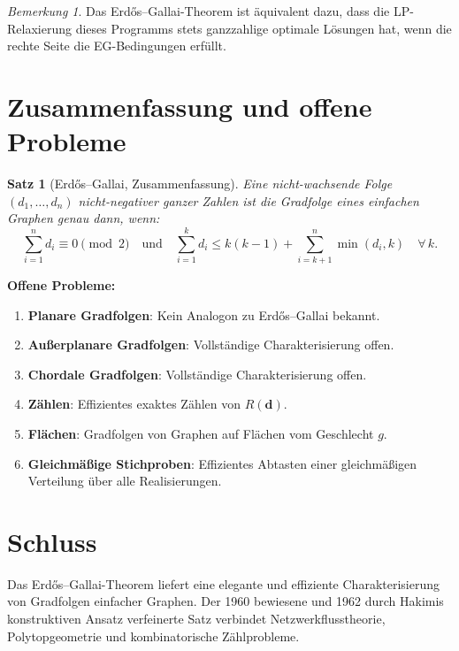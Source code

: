 \documentclass[12pt,a4paper]{amsart}
\newtheorem{satz}[theorem]{Satz}
\theoremstyle{definition}
\theoremstyle{remark}
\newtheorem{bemerkung}[theorem]{Bemerkung}
\begin{document}
\begin{bemerkung}
Das Erd\H{o}s--Gallai-Theorem ist äquivalent dazu, dass die LP-Relaxierung
dieses Programms stets ganzzahlige optimale Lösungen hat, wenn die rechte Seite
die EG-Bedingungen erfüllt.
\end{bemerkung}

\section{Zusammenfassung und offene Probleme}

\begin{satz}[Erd\H{o}s--Gallai, Zusammenfassung]
Eine nicht-wachsende Folge $(d_1, \ldots, d_n)$ nicht-negativer ganzer Zahlen ist
die Gradfolge eines einfachen Graphen genau dann, wenn:
\[
  \sum_{i=1}^n d_i \equiv 0 \pmod{2}
  \quad \text{und} \quad
  \sum_{i=1}^k d_i \leq k(k-1) + \sum_{i=k+1}^n \min(d_i, k)
  \quad \forall\, k.
\]
\end{satz}

\noindent\textbf{Offene Probleme:}
\begin{enumerate}[label=(\arabic*)]
  \item \textbf{Planare Gradfolgen}: Kein Analogon zu Erd\H{o}s--Gallai bekannt.
  \item \textbf{Außerplanare Gradfolgen}: Vollständige Charakterisierung offen.
  \item \textbf{Chordale Gradfolgen}: Vollständige Charakterisierung offen.
  \item \textbf{Zählen}: Effizientes exaktes Zählen von $R(\mathbf{d})$.
  \item \textbf{Flächen}: Gradfolgen von Graphen auf Flächen vom Geschlecht $g$.
  \item \textbf{Gleichmäßige Stichproben}: Effizientes Abtasten einer
        gleichmäßigen Verteilung über alle Realisierungen.
\end{enumerate}

\section{Schluss}

Das Erd\H{o}s--Gallai-Theorem liefert eine elegante und effiziente Charakterisierung
von Gradfolgen einfacher Graphen.
Der 1960 bewiesene und 1962 durch Hakimis konstruktiven Ansatz verfeinerte Satz
verbindet Netzwerkflusstheorie, Polytopgeometrie und kombinatorische Zählprobleme.
\end{document}
